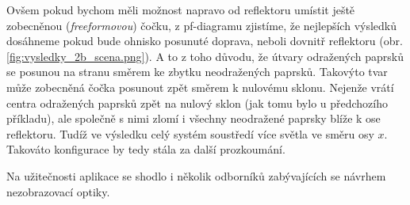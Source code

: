Ovšem pokud bychom měli možnost napravo od reflektoru umístit ještě zobecněnou (\emph{freeformovou}) čočku, z pf-diagramu zjistíme, že nejlepších výsledků dosáhneme pokud bude ohnisko posunuté doprava, neboli dovnitř reflektoru (obr. \ref{fig:vysledky_2b_scena.png}). A to z toho důvodu, že útvary odražených paprsků se posunou na stranu směrem ke zbytku neodražených paprsků. Takovýto tvar může zobecněná čočka posunout zpět směrem k nulovému sklonu. Nejenže vrátí centra odražených paprsků zpět na nulový sklon (jak tomu bylo u předchozího příkladu), ale společně s nimi zlomí i všechny neodražené paprsky blíže k ose reflektoru. Tudíž ve výsledku celý systém soustředí více světla ve směru osy $x$. Takováto konfigurace by tedy stála za další prozkoumání.

Na užitečnosti aplikace se shodlo i několik odborníků zabývajících se návrhem nezobrazovací optiky.\src {}
